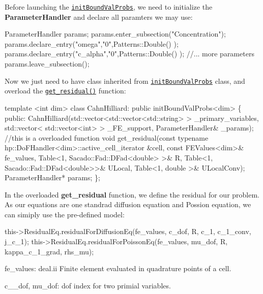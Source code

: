  Before launching the \href{../html/classinit_bound_val_probs.html}{\tt init\-Bound\-Val\-Probs}, we need to initialize the {\bfseries Parameter\-Handler} and declare all paramters we may use\-: 
\begin{DoxyCode}
ParameterHandler params;
params.enter\_subsection(\textcolor{stringliteral}{"Concentration"});   
params.declare\_entry(\textcolor{stringliteral}{"omega"},\textcolor{stringliteral}{"0"},Patterns::Double() );
params.declare\_entry(\textcolor{stringliteral}{"c\_alpha"},\textcolor{stringliteral}{"0"},Patterns::Double() );
\textcolor{comment}{//... more parameters }
params.leave\_subsection();  
\end{DoxyCode}
 Now we just need to have class inherited from \href{../html/classinit_bound_val_probs.html}{\tt init\-Bound\-Val\-Probs} class, and overload the \href{../html/classinit_bound_val_probs.html#ac8f2c3e2a1040c70b709900dc3dfdaea}{\tt get\-\_\-residual()} function\-: 
\begin{DoxyCode}
\textcolor{keyword}{template} <\textcolor{keywordtype}{int} dim>
\textcolor{keyword}{class }CahnHilliard: \textcolor{keyword}{public} initBoundValProbs<dim>
\{
    \textcolor{keyword}{public}:
        CahnHilliard(std::vector<std::vector<std::string> > \_primary\_variables, std::vector<
      std::vector<int> > \_FE\_support, ParameterHandler& \_params);
        \textcolor{comment}{//this is a overloaded function }
        \textcolor{keywordtype}{void} get_residual(\textcolor{keyword}{const} \textcolor{keyword}{typename} hp::DoFHandler<dim>::active\_cell\_iterator &cell, \textcolor{keyword}{const} 
      FEValues<dim>& fe\_values, Table<1, Sacado::Fad::DFad<double> >& R, Table<1, Sacado::Fad::DFad<double>>& ULocal, 
      Table<1, double >& ULocalConv);
        ParameterHandler* params;       
\};
\end{DoxyCode}
 In the overloaded {\bfseries get\-\_\-residual} function, we define the residual for our problem. As our equations are one standrad diffusion equation and Possion equation, we can simiply use the pre-\/defined model\-: 
\begin{DoxyCode}
this->ResidualEq.residualForDiffusionEq(fe\_values, c\_dof, R, c\_1, c\_1\_conv, j\_c\_1);
this->ResidualEq.residualForPoissonEq(fe\_values, mu\_dof, R, kappa\_c\_1\_grad, rhs\_mu);
\end{DoxyCode}
 fe\-\_\-values\-: deal.\-ii Finite element evaluated in quadrature points of a cell.

c\-\_\-\_\-dof, mu\-\_\-dof\-: dof index for two primial variables.

